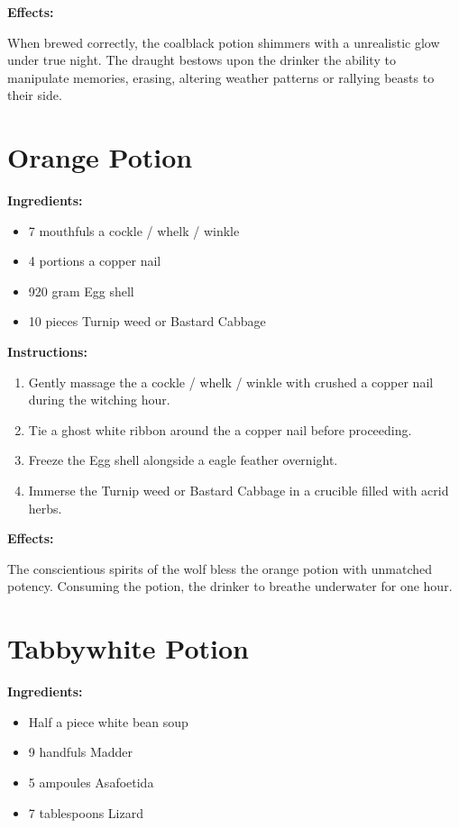 \documentclass{article}
\begin{document}
\textbf{Effects:}

When brewed correctly, the coalblack potion shimmers with a unrealistic glow under true night. The draught bestows upon the drinker the ability to manipulate memories, erasing, altering weather patterns or rallying beasts to their side.

\newpage
\section*{Orange Potion}

\textbf{Ingredients:}

\begin{itemize}
  \item 7 mouthfuls a cockle / whelk / winkle
  \item 4 portions a copper nail
  \item 920 gram Egg shell
  \item 10 pieces Turnip weed or Bastard Cabbage
\end{itemize}

\textbf{Instructions:}

\begin{enumerate}
  \item Gently massage the a cockle / whelk / winkle with crushed a copper nail during the witching hour.
  \item Tie a ghost white ribbon around the a copper nail before proceeding.
  \item Freeze the Egg shell alongside a eagle feather overnight.
  \item Immerse the Turnip weed or Bastard Cabbage in a crucible filled with acrid herbs.
\end{enumerate}

\textbf{Effects:}

The conscientious spirits of the wolf bless the orange potion with unmatched potency. Consuming the potion, the drinker to breathe underwater for one hour.

\newpage
\section*{Tabbywhite Potion}

\textbf{Ingredients:}

\begin{itemize}
  \item Half a piece white bean soup
  \item 9 handfuls Madder
  \item 5 ampoules Asafoetida
  \item 7 tablespoons Lizard
\end{itemize}
\end{document}
